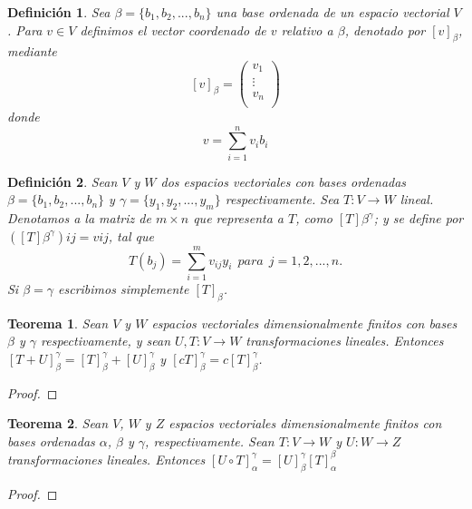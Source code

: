 \documentclass{book}
\newtheorem{theorem}{Teorema}
\newtheorem{definition}{Definición}
\begin{document}
\begin{definition}
Sea $\beta =\{ b_1,b_2,...,b_n\}$ una base ordenada de un espacio vectorial $V$. Para $v\in V$ definimos el vector coordenado de $v$ relativo a $\beta$, denotado por $[ v ]_{\beta}$, mediante
\[
[v]_{\beta}=\left( \begin{array}{c} v_1\\\vdots\\ v_n\\ \end{array} \right)
\]
donde
\[
v=\sum_{i=1}^{n}v_i b_i
\]
\end{definition}

\begin{definition}
Sean $V$ y $W$ dos espacios vectoriales con bases ordenadas $\beta=\{b_1,b_2,...,b_n\}$ y $\gamma=\{y_1,y_2,...,y_m\}$ respectivamente. Sea $T:V \rightarrow W$ lineal. Denotamos a la matriz de $m\times n$ que representa a $T$, como $[T]\beta ^{\gamma}$; y se define por $([T]\beta ^{\gamma}){ij}=v{ij}$, tal que
\[
T(b_j)=\sum_{i=1}^{m}v_{ij}y_i \ \ para \ \ j=1,2,...,n.
\]
Si $\beta=\gamma$ escribimos simplemente $[T]_{\beta}$.
\end{definition}

\begin{theorem}
Sean $V$ y $W$ espacios vectoriales dimensionalmente finitos con bases $\beta$ y $\gamma$ respectivamente, y sean $U,T:V \rightarrow W$ transformaciones lineales. Entonces $[T+U]_{\beta} ^{\gamma}=[T]_{\beta} ^{\gamma} +[U]_{\beta} ^{\gamma}$ y $[cT]_{\beta} ^{\gamma} = c[T]_{\beta} ^{\gamma}$.
\end{theorem}

\begin{proof}

\end{proof} 

\begin{theorem}
Sean $V$, $W$ y $Z$ espacios vectoriales dimensionalmente finitos con bases ordenadas $\alpha$, $\beta$ y $\gamma$, respectivamente. Sean $T:V \rightarrow W$ y $U:W \rightarrow Z$ transformaciones lineales. Entonces $[U\circ T]_{\alpha} ^{\gamma}=[U]_{\beta} ^{\gamma} [T]_{\alpha} ^{\beta}$
\end{theorem}

\begin{proof}

\end{proof}
\end{document}
